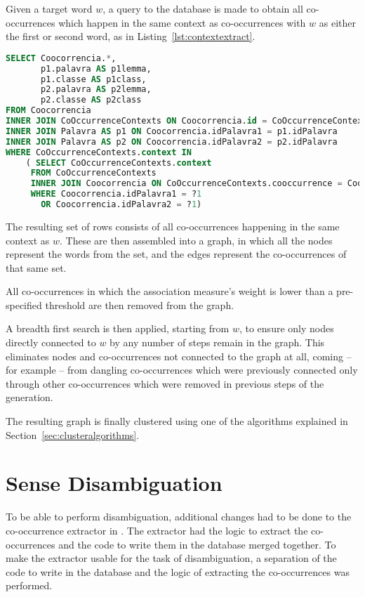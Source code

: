 Given a target word $w$, a query to the database is made to obtain all
co-occurrences which happen in the same context as co-occurrences with $w$ as
either the first or second word, as in Listing~\ref{lst:contextextract}.

\begin{lstlisting}[language=SQL,float=h,caption=SQL Query to extract all
co-occurrences in same context as the target word,label=lst:contextextract]
SELECT Coocorrencia.*,
       p1.palavra AS p1lemma,
       p1.classe AS p1class,
       p2.palavra AS p2lemma,
       p2.classe AS p2class
FROM Coocorrencia
INNER JOIN CoOccurrenceContexts ON Coocorrencia.id = CoOccurrenceContexts.cooccurrence
INNER JOIN Palavra AS p1 ON Coocorrencia.idPalavra1 = p1.idPalavra
INNER JOIN Palavra AS p2 ON Coocorrencia.idPalavra2 = p2.idPalavra
WHERE CoOccurrenceContexts.context IN
    ( SELECT CoOccurrenceContexts.context
     FROM CoOccurrenceContexts
     INNER JOIN Coocorrencia ON CoOccurrenceContexts.cooccurrence = Coocorrencia.id
     WHERE Coocorrencia.idPalavra1 = ?1
       OR Coocorrencia.idPalavra2 = ?1)
\end{lstlisting}

The resulting set of rows consists of all co-occurrences happening in the same
context as $w$. These are then assembled into a graph, in which all the nodes
represent the words from the set, and the edges represent the co-occurrences of
that same set.

All co-occurrences in which the association measure's weight is lower than a
pre-specified threshold are then removed from the graph.

A breadth first search is then applied, starting from $w$, to ensure only nodes
directly connected to $w$ by any number of steps remain in the graph. This
eliminates nodes and co-occurrences not connected to the graph at all, coming
-- for example -- from dangling co-occurrences which were previously connected
only through other co-occurrences which were removed in previous steps of the
generation.

The resulting graph is finally clustered using one of the algorithms explained
in Section~\ref{sec:clusteralgorithms}.

\section{Sense Disambiguation}

To be able to perform disambiguation, additional changes had to be done to the
co-occurrence extractor in \citep{correia2015syntax}. The extractor had the 
logic
to extract the co-occurrences and the code to write them in the database merged
together. To make the extractor usable for the task of disambiguation, a
separation of the code to write in the database and the logic of extracting the
co-occurrences was performed.

